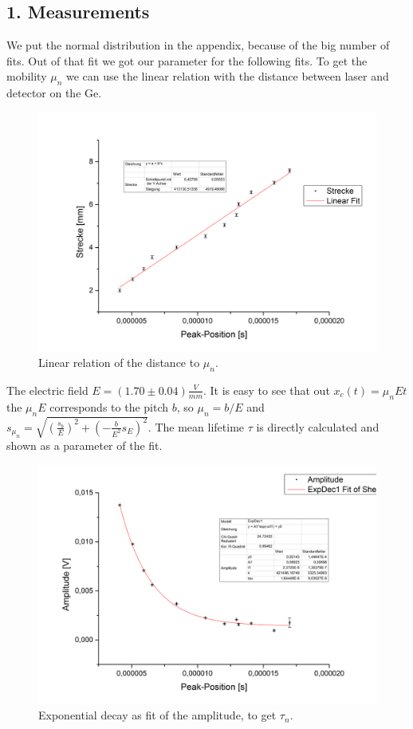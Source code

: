 \subsection*{1. Measurements}
We put the normal distribution in the appendix, because of the big number of fits. Out of that fit we got our parameter for the following fits.
To get the mobility $\mathit{\mu_{n}}$ we can use the linear relation with the distance between laser and detector on the Ge.
\begin{figure}[h]
\begin{center}
\includegraphics[scale=0.5]{Bilder/t2_1_my}
\caption{Linear relation of the distance to $\mathit{\mu_{n}}$. }
\label{fig:1my}
\end{center}
\end{figure}
The electric field $\mathit{E=(1.70\pm0.04)\frac{V}{mm}}$. It is easy to see that out $\mathit{x_{c}(t)=\mu_{n}Et}$ the $\mathit{\mu_{n}E}$ corresponds to the pitch $\mathit{b}$, so $\mathit{\mu_{n}=b/E}$ and $\mathit{s_{\mu_{n}}=\sqrt{(\frac{s_{b}}{E})^2+(-\frac{b}{E^2}s_{E})^2}}$.
\newpage
The mean lifetime $\mathit{\tau}$ is directly calculated and shown as a parameter of the fit.
\begin{figure}[h]
\begin{center}
\includegraphics[scale=0.5]{Bilder/t2_1_tau}
\caption{Exponential decay as fit of the amplitude, to get $\mathit{\tau_{n}}$. }
\label{fig:1tau}
\end{center}
\end{figure}
